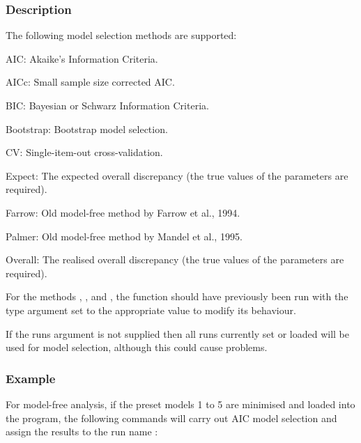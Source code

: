 \subsubsection{Description}

The following model selection methods are supported:


AIC:  Akaike's Information Criteria.


AICc:  Small sample size corrected AIC.


BIC:  Bayesian or Schwarz Information Criteria.


Bootstrap:  Bootstrap model selection.


CV:  Single-item-out cross-validation.


Expect:  The expected overall discrepancy (the true values of the parameters are required).


Farrow:  Old model-free method by Farrow et al., 1994.


Palmer:  Old model-free method by Mandel et al., 1995.


Overall:  The realised overall discrepancy (the true values of the parameters are required).


For the methods , , and , the function  should have previously been run with the type argument set to the appropriate value to modify its behaviour.


If the runs argument is not supplied then all runs currently set or loaded will be used for model selection, although this could cause problems.



\subsubsection{Example}

For model-free analysis, if the preset models 1 to 5 are minimised and loaded into the program, the following commands will carry out AIC model selection and assign the results to the run name :








